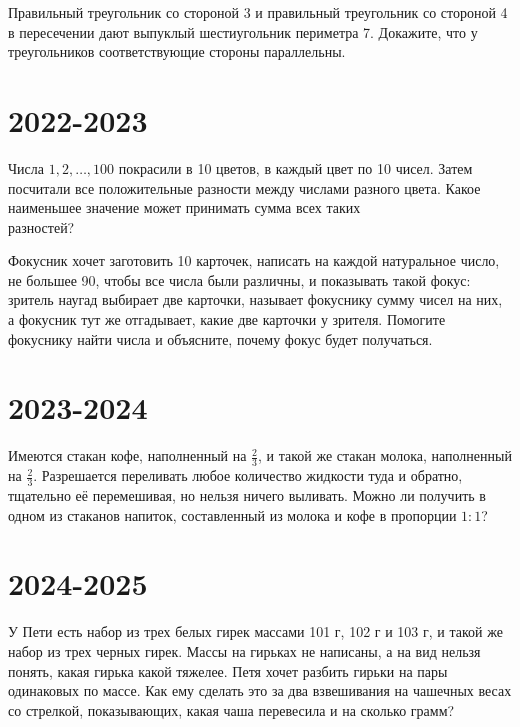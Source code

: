 \documentclass[11pt, a4paper]{common/document_template}
\begin{document}
\begin{exercise}[19]
Правильный треугольник со стороной 3 и правильный треугольник со стороной 4 в пересечении дают выпуклый шестиугольник периметра 7. Докажите, что у треугольников соответствующие стороны параллельны.
\end{exercise}

\chapter{2022-2023}

\begin{exercise}[12]
Числа $1, 2, \dots, 100$ покрасили в 10 цветов, в каждый цвет по 10 чисел. Затем посчитали все положительные разности между числами разного цвета. Какое наименьшее значение может принимать сумма всех таких \\ разностей?
\end{exercise}

\begin{exercise}[30]
Фокусник хочет заготовить 10 карточек, написать на каждой натуральное число, не большее 90, чтобы все числа были различны, и показывать такой фокус: зритель наугад выбирает две карточки,
называет фокуснику сумму чисел на них, а фокусник тут же отгадывает, какие две карточки у зрителя. Помогите фокуснику найти числа и объясните, почему фокус будет получаться.
\end{exercise}

\chapter{2023-2024}

\begin{exercise}[6]
Имеются стакан кофе, наполненный на $\frac{2}{3}$, и такой же стакан молока, наполненный на $\frac{2}{3}$. Разрешается переливать любое количество жидкости туда и обратно, тщательно её перемешивая, но нельзя ничего выливать. Можно ли получить в одном из стаканов напиток, составленный из молока и кофе в пропорции $1 : 1$?
\end{exercise}

\chapter{2024-2025}

\begin{exercise}[2]
У Пети есть набор из трех белых гирек массами 101 г, 102 г и 103 г, и такой же набор из трех черных гирек. Массы на гирьках не написаны, а на вид нельзя понять, какая гирька какой тяжелее. Петя хочет разбить гирьки на пары одинаковых по массе. Как ему сделать это за два взвешивания на чашечных весах со стрелкой, показывающих, какая чаша перевесила и на сколько грамм?
\end{exercise}
\end{document}

